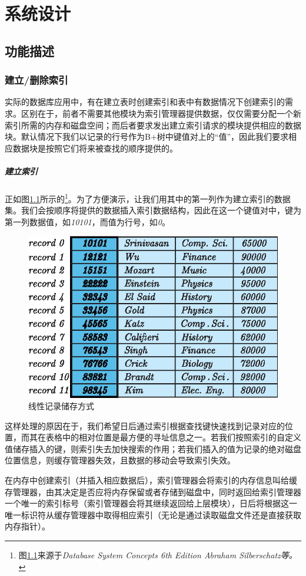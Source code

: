 \documentclass[UTF8]{ctexrep} %
\begin{document}
\chapter{系统设计}
\section{功能描述}
\subsection{建立/删除索引}
实际的数据库应用中，有在建立表时创建索引和表中有数据情况下创建索引的需求。区别在于，前者不需要其他模块为索引管理器提供数据，仅仅需要分配一个新索引所需的内存和磁盘空间；而后者要求发出建立索引请求的模块提供相应的数据块。默认情况下我们以记录的行号作为B+树中键值对上的“值”，因此我们要求相应数据块是按照它们将来被查找的顺序提供的。
\paragraph{建立索引}
正如图\ref{fig:index_example}所示的\footnote{图\ref{fig:index_example}来源于\textit{Database System Concepts 6th Edition Abraham Silberschatz等。}}。为了方便演示，让我们用其中的第一列作为建立索引的数据集。我们会按顺序将提供的数据插入索引数据结构，因此在这一个键值对中，键为第一列数据值，如\textit{10101}，而值为行号，如\textit{0}。
\begin{figure}[H]
    \centering
    \includegraphics[width=0.7\linewidth]{figure/index_example.eps}
    \caption{线性记录储存方式}
    \label{fig:index_example}
\end{figure}

这样处理的原因在于，我们希望日后通过索引根据查找键快速找到记录对应的位置，而其在表格中的相对位置是最方便的寻址信息之一。若我们按照索引的自定义值储存插入的键，则索引失去加快搜索的作用；若我们插入的值为记录的绝对磁盘位置信息，则缓存管理器失效，且数据的移动会导致索引失效。
\par
在内存中创建索引（并插入相应数据后），索引管理器会将索引的内存信息叫给缓存管理器，由其决定是否应将内存保留或者存储到磁盘中，同时返回给索引管理器一个唯一的索引标号（索引管理器会将其继续返回给上层模块），日后将根据这一唯一标识符从缓存管理器中取得相应索引（无论是通过读取磁盘文件还是直接获取内存指针）。
\end{document}
